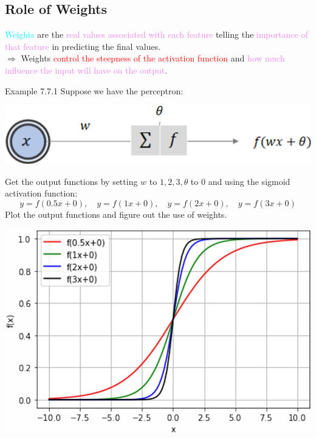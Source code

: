 \documentclass{book}
\begin{document}
\subsection{Role of Weights}
\textcolor{cyan}{Weights} are the \textcolor{violet}{real values associated with each feature} telling the \textcolor{violet}{importance of that feature} in predicting the final values.\\
$\Rightarrow$ Weights \textcolor{red}{control the steepness of the activation function} and \textcolor{violet}{how much influence the input will have on the output}.
\begin{egBox}{Example 7.7.1}{}
Suppose we have the perceptron:
\begin{center}
    \includegraphics[scale=0.12]{chapter 7/ch7_figure29.jpeg}
\end{center}
Get the output functions by setting $w$ to \(1, 2, 3, \theta\) to 0 and using the sigmoid activation function:
\[
    y = f(0.5x+0), \quad y = f(1x+0), \quad y = f(2x+0), \quad y = f(3x+0)
\]
Plot the output functions and figure out the use of weights.
\begin{center}
    \includegraphics[scale=0.18]{chapter 7/ch7_figure30.jpeg}
\end{center}
\end{egBox}
\newpage
\end{document}
